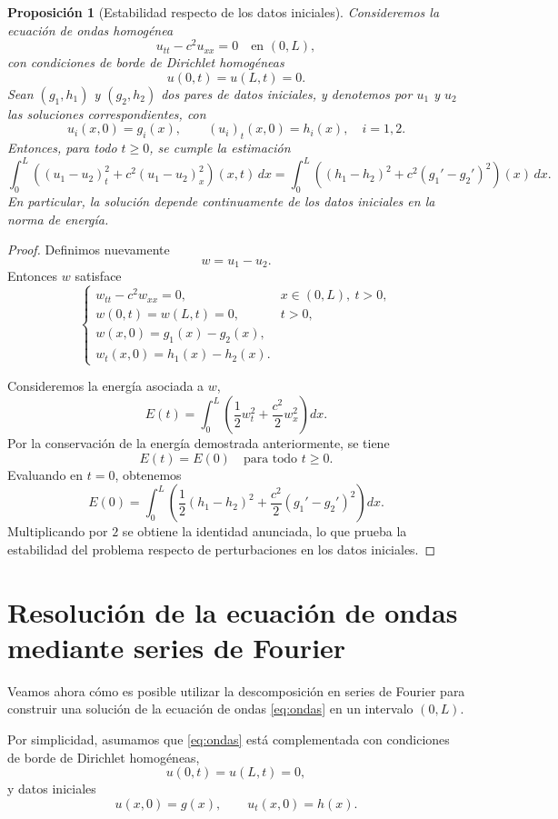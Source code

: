 \documentclass[12pt, a4paper]{amsbook}
\newtheorem{prop}[teo]{Proposición}
\theoremstyle{remark}
\theoremstyle{definition}
\numberwithin{section}{chapter}
\numberwithin{subsection}{section}
\numberwithin{equation}{section}
\numberwithin{figure}{chapter}
\begin{document}
\begin{prop}[Estabilidad respecto de los datos iniciales]
Consideremos la ecuación de ondas homogénea
\[
u_{tt} - c^2 u_{xx} = 0 \quad \text{en } (0,L),
\]
con condiciones de borde de Dirichlet homogéneas
\[
u(0,t)=u(L,t)=0.
\]
Sean $(g_1,h_1)$ y $(g_2,h_2)$ dos pares de datos iniciales, y denotemos por $u_1$ y $u_2$ las soluciones correspondientes, con
\[
u_i(x,0)=g_i(x), \qquad (u_i)_t(x,0)=h_i(x), \quad i=1,2.
\]
Entonces, para todo $t\ge 0$, se cumple la estimación
\[
\int_0^L \left( (u_1-u_2)_t^2 + c^2 (u_1-u_2)_x^2 \right)(x,t)\,dx
=
\int_0^L \left( (h_1-h_2)^2 + c^2 (g_1'-g_2')^2 \right)(x)\,dx.
\]
En particular, la solución depende continuamente de los datos iniciales en la norma de energía.
\end{prop}

\begin{proof}
Definimos nuevamente
\[
w = u_1 - u_2.
\]
Entonces $w$ satisface
\[
\begin{cases}
w_{tt} - c^2 w_{xx} = 0, & x\in(0,L),\ t>0,\\
w(0,t)=w(L,t)=0, & t>0,\\
w(x,0)=g_1(x)-g_2(x),\\
w_t(x,0)=h_1(x)-h_2(x).
\end{cases}
\]

Consideremos la energía asociada a $w$,
\[
E(t) = \int_0^L \left( \frac12 w_t^2 + \frac{c^2}{2} w_x^2 \right) dx.
\]
Por la conservación de la energía demostrada anteriormente, se tiene
\[
E(t) = E(0) \quad \text{para todo } t\ge 0.
\]
Evaluando en $t=0$, obtenemos
\[
E(0)
= \int_0^L \left( \frac12 (h_1-h_2)^2 + \frac{c^2}{2} (g_1'-g_2')^2 \right) dx.
\]
Multiplicando por $2$ se obtiene la identidad anunciada, lo que prueba la estabilidad del problema respecto de perturbaciones en los datos iniciales.
\end{proof}

\section{Resolución de la ecuación de ondas mediante series de Fourier}\label{sec:ondas-fourier}

Veamos ahora cómo es posible utilizar la descomposición en series de Fourier para construir una solución de la ecuación de ondas \eqref{eq:ondas} en un intervalo $(0,L)$.

Por simplicidad, asumamos que \eqref{eq:ondas} está complementada con condiciones de borde de Dirichlet homogéneas,
\[
u(0,t)=u(L,t)=0,
\]
y datos iniciales
\[
u(x,0)=g(x), \qquad u_t(x,0)=h(x).
\]
\end{document}
